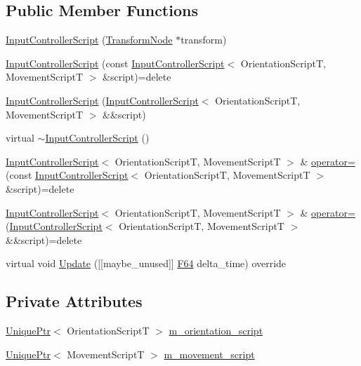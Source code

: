 \subsection*{Public Member Functions}
\begin{DoxyCompactItemize}
\item 
\hyperlink{classmage_1_1_input_controller_script_adf1edb71170cb5184f201a64ad7455cb}{Input\+Controller\+Script} (\hyperlink{classmage_1_1_transform_node}{Transform\+Node} $\ast$transform)
\item 
\hyperlink{classmage_1_1_input_controller_script_a22de786b39180e18b8565b211797388d}{Input\+Controller\+Script} (const \hyperlink{classmage_1_1_input_controller_script}{Input\+Controller\+Script}$<$ Orientation\+ScriptT, Movement\+ScriptT $>$ \&script)=delete
\item 
\hyperlink{classmage_1_1_input_controller_script_a18b905c7a204c22173dcaf19a9587f7d}{Input\+Controller\+Script} (\hyperlink{classmage_1_1_input_controller_script}{Input\+Controller\+Script}$<$ Orientation\+ScriptT, Movement\+ScriptT $>$ \&\&script)
\item 
virtual \hyperlink{classmage_1_1_input_controller_script_ac5699d9a4d9a3f9c456885a92dede979}{$\sim$\+Input\+Controller\+Script} ()
\item 
\hyperlink{classmage_1_1_input_controller_script}{Input\+Controller\+Script}$<$ Orientation\+ScriptT, Movement\+ScriptT $>$ \& \hyperlink{classmage_1_1_input_controller_script_a747a0a1cb4064a5b8580195c0a53b887}{operator=} (const \hyperlink{classmage_1_1_input_controller_script}{Input\+Controller\+Script}$<$ Orientation\+ScriptT, Movement\+ScriptT $>$ \&script)=delete
\item 
\hyperlink{classmage_1_1_input_controller_script}{Input\+Controller\+Script}$<$ Orientation\+ScriptT, Movement\+ScriptT $>$ \& \hyperlink{classmage_1_1_input_controller_script_a2e2231433ec17577ce019348285eaba3}{operator=} (\hyperlink{classmage_1_1_input_controller_script}{Input\+Controller\+Script}$<$ Orientation\+ScriptT, Movement\+ScriptT $>$ \&\&script)=delete
\item 
virtual void \hyperlink{classmage_1_1_input_controller_script_ae964c7b2c90fa2addb32562921376c80}{Update} (\mbox{[}\mbox{[}maybe\+\_\+unused\mbox{]}\mbox{]} \hyperlink{namespacemage_ad26233bbec640deda836e572c1a23708}{F64} delta\+\_\+time) override
\end{DoxyCompactItemize}
\subsection*{Private Attributes}
\begin{DoxyCompactItemize}
\item 
\hyperlink{namespacemage_a3316d7143a973e37adf1110f2e80ca31}{Unique\+Ptr}$<$ Orientation\+ScriptT $>$ \hyperlink{classmage_1_1_input_controller_script_ab5af05a3bf7cdd672382dd5bcb1d6d02}{m\+\_\+orientation\+\_\+script}
\item 
\hyperlink{namespacemage_a3316d7143a973e37adf1110f2e80ca31}{Unique\+Ptr}$<$ Movement\+ScriptT $>$ \hyperlink{classmage_1_1_input_controller_script_aea0478602dbabf616dd3ef8b4408a42a}{m\+\_\+movement\+\_\+script}
\end{DoxyCompactItemize}
